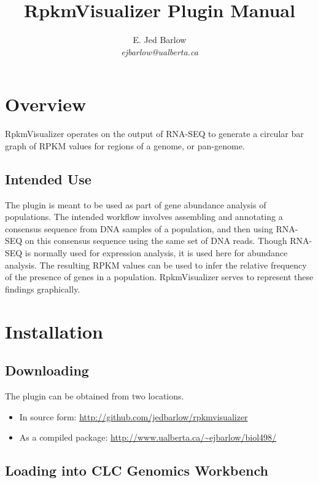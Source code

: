 \documentclass[12pt,letterpaper]{article}
\author{
    E. Jed Barlow\\
    \textit{ejbarlow@ualberta.ca}
}
\title{RpkmVisualizer Plugin Manual}
\begin{document}
\maketitle

\hfill

\tableofcontents

\newpage
\section{Overview}


RpkmVisualizer operates on the output of RNA-SEQ to generate a circular bar
graph of RPKM values for regions of a genome, or pan-genome.

\subsection{Intended Use}

The plugin is meant to be used as part of gene abundance analysis of
populations.  The intended workflow involves assembling and annotating a
consensus sequence from DNA samples of a population, and then using RNA-SEQ on
this consensus sequence using the same set of DNA reads.  Though RNA-SEQ is
normally used for expression analysis, it is used here for abundance analysis.
The resulting RPKM values can be used to infer the relative frequency of the
presence of genes in a population.  RpkmVisualizer serves to represent these
findings graphically.

\section{Installation}

\subsection{Downloading}

The plugin can be obtained from two locations.

\begin{itemize}
\item
    In source form: \url{http://github.com/jedbarlow/rpkmvisualizer}
\item
    As a compiled package: \url{http://www.ualberta.ca/~ejbarlow/biol498/}
\end{itemize}

\subsection{Loading into CLC Genomics Workbench}
\end{document}
